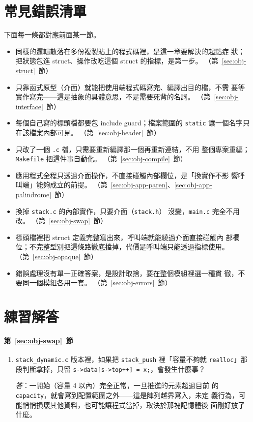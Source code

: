 
\section{常見錯誤清單}
\label{sec:obj-checklist}

下面每一條都對應前面某一節。

\begin{itemize}
\item 同樣的邏輯散落在多份複製貼上的程式碼裡，是這一章要解決的起點症
狀；把狀態包進 struct、操作改吃這個 struct 的指標，是第一步。
（第~\ref{sec:obj-struct}~節）
\item 只靠函式原型（介面）就能把使用端程式碼寫完、編譯出目的檔，不需
要等實作寫完——這是抽象的具體意思，不是需要死背的名詞。
（第~\ref{sec:obj-interface}~節）
\item 每個自己寫的標頭檔都要包 include guard；檔案範圍的
\texttt{static} 讓一個名字只在該檔案內部可見。
（第~\ref{sec:obj-header}~節）
\item 只改了一個 \texttt{.c} 檔，只需要重新編譯那一個再重新連結，不用
整個專案重編；\texttt{Makefile} 把這件事自動化。
（第~\ref{sec:obj-compile}~節）
\item 應用程式全程只透過介面操作，不直接碰觸內部欄位，是「換實作不影
響呼叫端」能夠成立的前提。
（第~\ref{sec:obj-app-paren}、\ref{sec:obj-app-palindrome}~節）
\item 換掉 \texttt{stack.c} 的內部實作，只要介面（\texttt{stack.h}）
沒變，\texttt{main.c} 完全不用改。
（第~\ref{sec:obj-swap}~節）
\item 標頭檔裡把 struct 定義完整寫出來，呼叫端就能繞過介面直接碰觸內
部欄位；不完整型別把這條路徹底擋掉，代價是呼叫端只能透過指標使用。
（第~\ref{sec:obj-opaque}~節）
\item 錯誤處理沒有單一正確答案，是設計取捨，要在整個模組裡選一種貫
徹，不要同一個模組各用一套。
（第~\ref{sec:obj-errors}~節）
\end{itemize}

{}
\section*{練習解答}

\paragraph{第~\ref{sec:obj-swap}~節}
\begin{enumerate}
\item \texttt{stack\_dynamic.c} 版本裡，如果把 \texttt{stack\_push}
裡「容量不夠就 \texttt{realloc}」那段判斷拿掉，只留
\texttt{s->data[s->top++] = x;}，會發生什麼事？

\textit{答}：一開始（容量 4 以內）完全正常，一旦推進的元素超過目前
的 \texttt{capacity}，就會寫到配置範圍之外——這是陣列越界寫入，未定
義行為，可能悄悄損壞其他資料，也可能讓程式當掉，取決於那塊記憶體後
面剛好放了什麼。
\end{enumerate}


